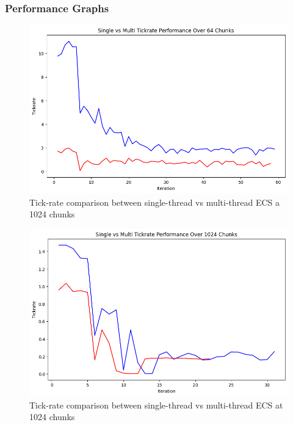 \subsubsection{Performance Graphs}
\begin{figure}[htbp]
    \centering
    \includegraphics[width=0.65\linewidth]{resources/64chunks.png}
    \caption{Tick-rate comparison between single-thread vs multi-thread ECS a 1024 chunks}
    \label{fig:graph2}
\end{figure}

\begin{figure}[htbp]
    \centering
    \includegraphics[width=0.65\linewidth]{resources/1024chunks.png}
    \caption{Tick-rate comparison between single-thread vs multi-thread ECS at 1024 chunks}
    \label{fig:graph2}
\end{figure}

